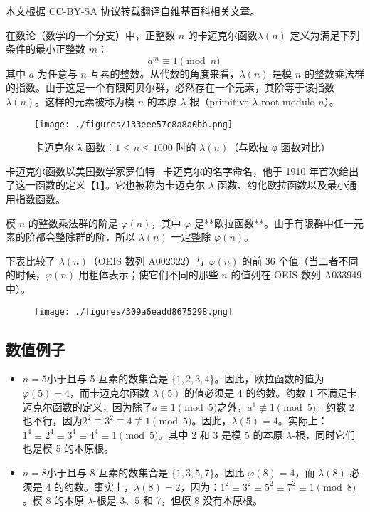 
本文根据 CC-BY-SA 协议转载翻译自维基百科\href{https://en.wikipedia.org/wiki/Carmichael_function}{相关文章}。

在数论（数学的一个分支）中，正整数 $n$ 的卡迈克尔函数$\lambda(n)$ 定义为满足下列条件的最小正整数 $m$：
$$
a^{m} \equiv 1 \pmod{n}~
$$
其中 $a$ 为任意与 $n$ 互素的整数。从代数的角度来看，$\lambda(n)$ 是模 $n$ 的整数乘法群的指数。由于这是一个有限阿贝尔群，必然存在一个元素，其阶等于该指数 $\lambda(n)$。这样的元素被称为模 $n$ 的本原 $\lambda$-根（primitive $\lambda$-root modulo $n$）。
\begin{figure}[ht]
\centering
\texttt{[image: ./figures/133eee57c8a8a0bb.png]}
\caption{卡迈克尔 λ 函数：$1 \le n \le 1000$ 时的 $\lambda(n)$（与欧拉 φ 函数对比）} \label{fig_KMKRhs_1}
\end{figure}
卡迈克尔函数以美国数学家罗伯特·卡迈克尔的名字命名，他于 1910 年首次给出了这一函数的定义【1】。它也被称为卡迈克尔 $\lambda$ 函数、约化欧拉函数以及最小通用指数函数。

模 $n$ 的整数乘法群的阶是 $\varphi(n)$，其中 $\varphi$ 是**欧拉函数**。由于有限群中任一元素的阶都会整除群的阶，所以 $\lambda(n)$ 一定整除 $\varphi(n)$。

下表比较了 $\lambda(n)$（OEIS 数列 A002322）与 $\varphi(n)$ 的前 36 个值（当二者不同的时候，$\varphi(n)$ 用粗体表示；使它们不同的那些 $n$ 的值列在 OEIS 数列 A033949 中）。
\begin{figure}[ht]
\centering
\texttt{[image: ./figures/309a6eadd8675298.png]}
\caption{} \label{fig_KMKRhs_2}
\end{figure}
\subsection{数值例子}
\begin{itemize}
\item $ n = 5$小于且与 5 互素的数集合是 $\{1, 2, 3, 4\}$。因此，欧拉函数的值为 $\varphi(5) = 4$，而卡迈克尔函数 $\lambda(5)$ 的值必须是 4 的约数。约数 1 不满足卡迈克尔函数的定义，因为除了$a \equiv 1 \pmod{5}$之外，$a^1 \not\equiv 1 \pmod{5}$。约数 2 也不行，因为$2^2 \equiv 3^2 \equiv 4 \not\equiv 1 \pmod{5}$。因此，$\lambda(5) = 4$。实际上：$1^4 \equiv 2^4 \equiv 3^4 \equiv 4^4 \equiv 1 \pmod{5}$。其中 2 和 3 是模 5 的本原 $\lambda$-根，同时它们也是模 5 的本原根。
\item $ n = 8$小于且与 8 互素的数集合是 $\{1, 3, 5, 7\}$。因此 $\varphi(8) = 4$，而 $\lambda(8)$ 必须是 4 的约数。事实上，$\lambda(8) = 2$，因为：$
1^2 \equiv 3^2 \equiv 5^2 \equiv 7^2 \equiv 1 \pmod{8}$。模 8 的本原 $\lambda$-根是 3、5 和 7，但模 8 没有本原根。
\end{itemize}
